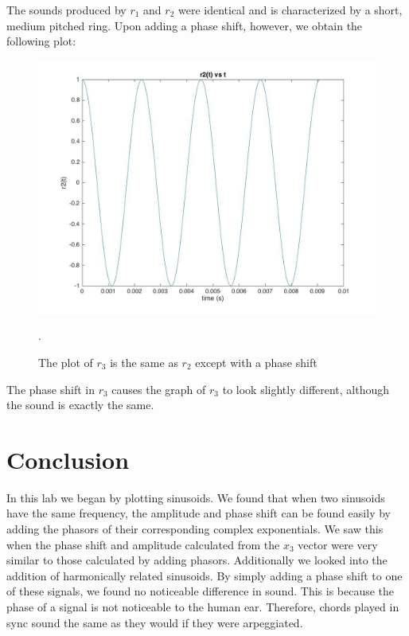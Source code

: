 \documentclass{article}
\begin{document}
The sounds produced by $r_1$ and $r_2$ were identical and is characterized by a short, medium pitched ring. Upon adding a phase shift, however, we obtain the following plot:

\begin{figure}
\centering
\includegraphics[scale = 0.2] {figure3_part3.jpg}
\caption{The plot of $r_3$ is the same as $r_2$ except with a phase shift}. 
\end{figure}

The phase shift in $r_3$ causes the graph of $r_3$ to look slightly different, although the sound is exactly the same. 




\section{Conclusion}
In this lab we began by plotting sinusoids. We found that when two sinusoids have the same frequency, the amplitude and phase shift can be found easily by adding the phasors of their corresponding complex exponentials. We saw this when the phase shift and amplitude calculated from the $x_3$ vector were very similar to those calculated by adding phasors. Additionally we looked into the addition of harmonically related sinusoids. By simply adding a phase shift  to one of these signals, we found no noticeable difference in sound. This is because the phase of a signal is not noticeable to the human ear. Therefore, chords played in sync sound the same as they would if they were arpeggiated. 
\end{document}
